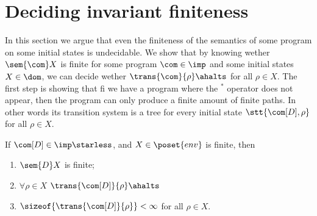 \section{Deciding invariant finiteness}\label{sec:finiteness}

In this section we argue that even the finiteness of the semantics of
some program on some initial states is undecidable. We show that by
knowing wether \(\sem{\com}X\) is finite for some program
\(\com\in\imp\) and some initial states \(X\in \dom\), we can decide
wether \(\trans{\com}{\rho}\ahalts\) for all \(\rho \in X\). The first
step is showing that fi we have a program where the \(^*\) operator
does not appear, then the program can only produce a finite amount of
finite paths. In other words its transition system is a tree for every
initial state \(\stt{\com[D], \rho}\) for all \(\rho \in X\).

\begin{lemma}\label{le:finiteness}
  If \(\com[D]\in\imp\starless\), and \(X \in \poset{env}\) is
  finite, then
  \begin{enumerate}[label=(\roman*).]
  \item \(\sem{D}X\) is finite;
  \item \(\forall \rho \in X\) \(\trans{\com[D]}{\rho}\ahalts\)
  \item \(\sizeof{\trans{\com[D]}{\rho}} < \infty\) for all
    \(\rho \in X\).
  \end{enumerate}
\end{lemma}

